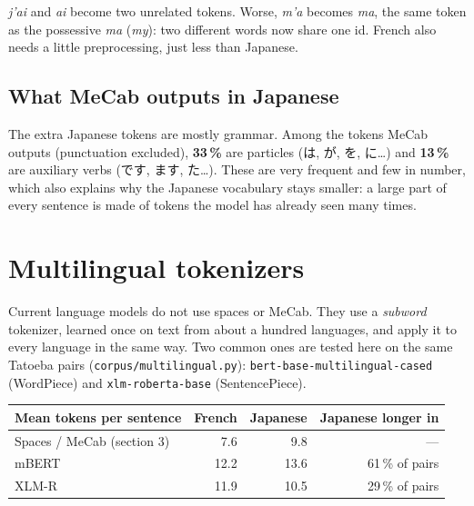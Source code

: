 \documentclass[11pt,a4paper]{article}
\newcommand\code[1]{\texttt{#1}}
\begin{document}
\begin{center}
\end{center}

\emph{j'ai} and \emph{ai} become two unrelated tokens. Worse, \emph{m'a}
becomes \emph{ma}, the same token as the possessive \emph{ma}
(\emph{my}): two different words now share one id. French also needs a
little preprocessing, just less than Japanese.

\subsection{What MeCab outputs in Japanese}

The extra Japanese tokens are mostly grammar. Among the tokens MeCab outputs
(punctuation excluded), \textbf{33\,\%} are particles (は, が, を, に…) and
\textbf{13\,\%} are auxiliary verbs (です, ます, た…). These are very frequent
and few in number, which also explains why the Japanese vocabulary stays
smaller: a large part of every sentence is made of tokens the model has
already seen many times.

\section{Multilingual tokenizers}

Current language models do not use spaces or MeCab. They use a
\emph{subword} tokenizer, learned once on text from about a hundred languages,
and apply it to every language in the same way. Two common ones are tested
here on the same Tatoeba pairs (\code{corpus/multilingual.py}):
\code{bert-base-multilingual-cased} (WordPiece) and \code{xlm-roberta-base}
(SentencePiece).

\begin{table}[H]
\centering
\begin{tabular}{l r r r}
  \toprule
  Mean tokens per sentence & \textcolor{fr}{French} & \textcolor{ja}{Japanese} & Japanese longer in \\
  \midrule
  Spaces / MeCab (section 3) & 7.6 & 9.8 & --- \\
  mBERT & 12.2 & 13.6 & 61\,\% of pairs \\
  XLM-R & 11.9 & 10.5 & 29\,\% of pairs \\
  \bottomrule
\end{tabular}
\end{table}
\end{document}
